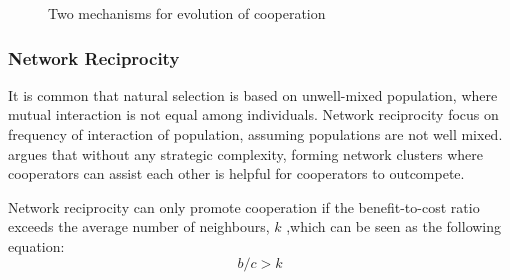 \begin{figure}[!htb]
  \centering
	\quad
  \caption[Two mechanisms for evolution of cooperation]{Two mechanisms for evolution of cooperation \citep{nowak2006five}}
  \label{Figure:figdf}
\end{figure}

\subsubsection{Network Reciprocity}
It is common that natural selection is based on unwell-mixed population, where mutual interaction is not equal among individuals. Network reciprocity focus on frequency of interaction of population, assuming populations are not well mixed. \citet{nowak1992evolutionary} argues that without any strategic complexity, forming network clusters where cooperators can assist each other is helpful for cooperators to outcompete.

Network reciprocity can only promote cooperation if the benefit-to-cost ratio exceeds the average number of neighbours, $k$ ,which can be seen as the following equation:
\begin{equation}\label{eq:2.4}
    b/c > k
\end{equation}
